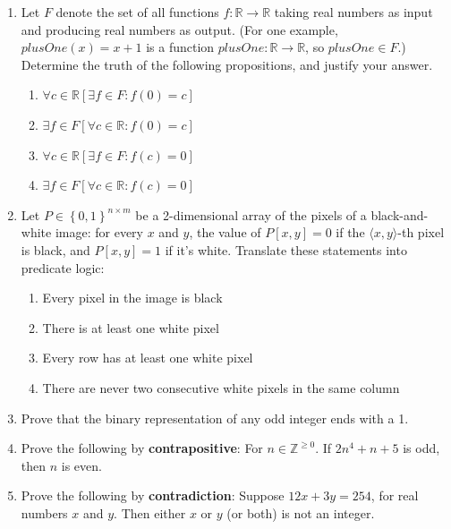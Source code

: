 \documentclass[11pt, oneside]{article}   	%
\newcommand{\reals}{\mathbb{R}}
\newcommand{\ints}{\mathbb{Z}}
\begin{document}
\begin{enumerate}
\item Let $F$ denote the set of all functions $f : \reals \rightarrow \reals$ taking real numbers as input and producing real numbers as output. 
(For one example, $plusOne(x) = x + 1$ is a function $plusOne : \reals \rightarrow \reals$, so $plusOne\in F$.) 
Determine the truth of the following propositions, and justify your answer. 
\begin{enumerate}
\item $\forall c \in \reals \left[\exists f \in F : f(0) = c\right]$
\item $\exists f \in F \left[\forall c \in \reals : f(0) = c\right]$
\item $\forall c \in \reals \left[\exists f \in F : f(c) = 0 \right]$
\item $\exists f \in F \left[\forall c \in \reals : f(c) = 0 \right]$
\end{enumerate}

\item 
Let $P \in \left\{0,1\right\}^{n\times m}$ be a 2-dimensional array of the pixels of a black-and-white image: 
for every $x$ and $y$, the value of $P[x, y] = 0$
if the $\langle x, y\rangle$-th pixel is black, and $P[x, y] = 1$ if it’s white. 
Translate these statements into predicate logic:
\begin{enumerate}
\item Every pixel in the image is black
\item There is at least one white pixel
\item Every row has at least one white pixel
\item There are never two consecutive white pixels in the same column
\end{enumerate}

\item Prove that the binary representation of any odd integer ends with a 1.

\item Prove the following by \textbf{contrapositive}: For $n\in\ints^{\ge0}$. If $2n^4 +n+5$ is odd, then $n$ is even.

\item Prove the following by \textbf{contradiction}: Suppose $12x+3y=254$, for real numbers $x$ and $y$. Then either $x$ or $y$ (or both) is not an integer.


\end{enumerate}
\end{document}
